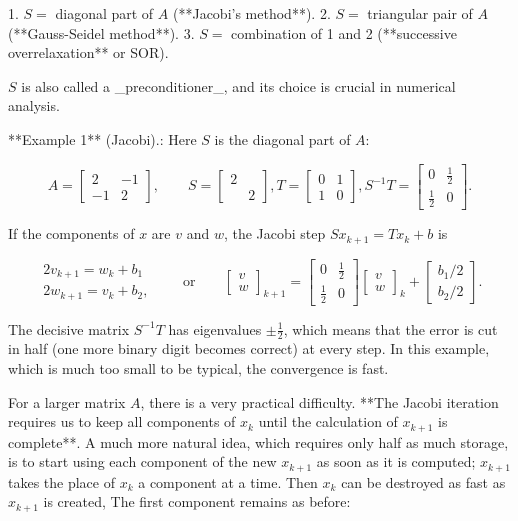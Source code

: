 1. \(S=\) diagonal part of \(A\) (**Jacobi's method**).
2. \(S=\) triangular pair of \(A\) (**Gauss-Seidel method**).
3. \(S=\) combination of 1 and 2 (**successive overrelaxation** or SOR).

\(S\) is also called a _preconditioner_, and its choice is crucial in numerical analysis.

**Example 1** (Jacobi).: Here \(S\) is the diagonal part of \(A\):

\[A=\begin{bmatrix}2&-1\\ -1&2\end{bmatrix},\qquad S=\begin{bmatrix}2\\ &2\end{bmatrix},T=\begin{bmatrix}0&1\\ 1&0\end{bmatrix},S^{-1}T=\begin{bmatrix}0&\frac{1}{2}\\ \frac{1}{2}&0\end{bmatrix}.\]

If the components of \(x\) are \(v\) and \(w\), the Jacobi step \(Sx_{k+1}=Tx_{k}+b\) is

\[\begin{array}{l}2v_{k+1}=w_{k}+b_{1}\\ 2w_{k+1}=v_{k}+b_{2},\end{array}\qquad\text{or}\qquad\begin{bmatrix}v\\ w\end{bmatrix}_{k+1}=\begin{bmatrix}0&\frac{1}{2}\\ \frac{1}{2}&0\end{bmatrix}\begin{bmatrix}v\\ w\end{bmatrix}_{k}+\begin{bmatrix}b_{1}/2\\ b_{2}/2\end{bmatrix}.\]

The decisive matrix \(S^{-1}T\) has eigenvalues \(\pm\frac{1}{2}\), which means that the error is cut in half (one more binary digit becomes correct) at every step. In this example, which is much too small to be typical, the convergence is fast.

For a larger matrix \(A\), there is a very practical difficulty. **The Jacobi iteration requires us to keep all components of \(x_{k}\) until the calculation of \(x_{k+1}\) is complete**. A much more natural idea, which requires only half as much storage, is to start using each component of the new \(x_{k+1}\) as soon as it is computed; \(x_{k+1}\) takes the place of \(x_{k}\) a component at a time. Then \(x_{k}\) can be destroyed as fast as \(x_{k+1}\) is created, The first component remains as before:

